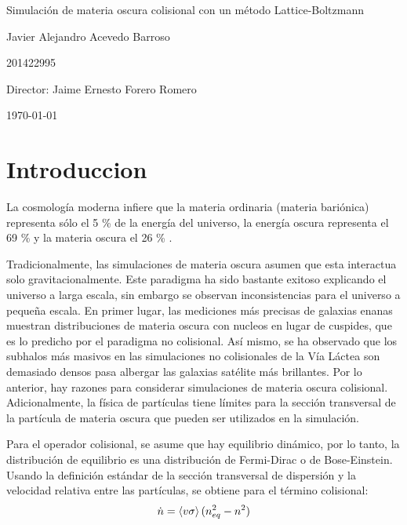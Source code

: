 \documentclass[12pt]{article}
\begin{document}
\begin{center}
\Huge
Simulación de materia oscura colisional con un método Lattice-Boltzmann

\vspace{3mm}
\Large Javier Alejandro Acevedo Barroso

\large
201422995


\vspace{2mm}
\Large
Director: Jaime Ernesto Forero Romero

\normalsize
\vspace{2mm}

\today
\end{center}


\normalsize
\newpage
\section{Introduccion}
La cosmología moderna infiere que la materia ordinaria (materia
bariónica) representa s\'olo el 5 \% de la energía del universo, la
energía oscura representa el 69 \% y la materia oscura el 26 \%
\cite{planckCitetion}.   

Tradicionalmente, las simulaciones de materia oscura asumen que esta
interactua solo gravitacionalmente. Este paradigma ha sido bastante
exitoso explicando el universo a larga escala, sin embargo se observan
inconsistencias para el universo a pequeña escala. En primer lugar,
las mediciones más precisas de galaxias enanas muestran distribuciones
de materia oscura con nucleos en lugar de cuspides, que es lo predicho
por el paradigma no colisional. Así mismo, se ha observado que los
subhalos más masivos en las simulaciones no colisionales de la Vía
Láctea son demasiado densos pasa albergar las galaxias satélite más
brillantes\cite{beyondColl}. Por lo anterior, hay razones para
considerar simulaciones de materia oscura colisional. Adicionalmente,
la física de partículas tiene límites para la sección transversal de
la partícula de materia oscura que pueden ser utilizados en la
simulación. 

Para el operador colisional, se asume que hay equilibrio dinámico, por
lo tanto, la distribución de equilibrio es una distribución de
Fermi-Dirac o de Bose-Einstein. Usando la definición estándar de la
sección transversal de dispersión y la velocidad relativa entre las
partículas, se obtiene para el término colisional\cite{mariangela}: 
\begin{equation}
\dot{n} = \expval{v \sigma} (n_{eq}^2 - n^2)
\label{colision}
\end{equation}
\end{document}
